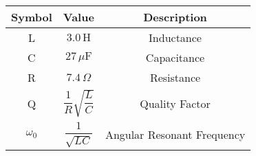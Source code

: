 \begin{tabular}{|c|c|c|}
    \hline
     \textbf{Symbol} & \textbf{Value} &
     \textbf{Description}\\
    \hline
     L &  $3.0\,
     \text{H}$ & Inductance\\
    \hline 
     C &  $27\, \mu\text{F}$ & Capacitance \\
    \hline
     R &  $7.4\, \Omega$ & Resistance\\
    \hline
     Q & $\dfrac{1}{R}\sqrt{\dfrac{L}{C}}$ & Quality Factor\\[6pt]
    \hline
     $\omega_0$ & $\dfrac{1}{\sqrt{LC}}$ & Angular Resonant Frequency\\[8pt]
    \hline
\end{tabular}
